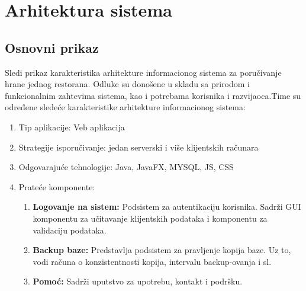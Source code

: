 \newpage
\section{Arhitektura sistema}
\subsection{Osnovni prikaz}
Sledi prikaz karakteristika arhitekture informacionog sistema za poručivanje hrane jednog restorana. Odluke su donošene u skladu sa prirodom i funkcionalnim zahtevima sistema, kao i potrebama korisnika i razvijaoca.Time su određene sledeće karakteristike arhitekture informacionog sistema:
\begin{enumerate}
    \item Tip aplikacije: Veb aplikacija
    \item Strategije isporučivanje: jedan serverski i više klijentskih računara
    \item Odgovarajuće tehnologije: Java, JavaFX, MYSQL, JS, CSS
    \item Prateće komponente:
    \begin{enumerate}
        \item \textbf{Logovanje na sistem:} Podsistem za autentikaciju korisnika. Sadrži GUI komponentu za učitavanje klijentskih podataka i komponentu za validaciju podataka.
        \item \textbf{Backup baze:} Predstavlja podsistem za pravljenje kopija baze. Uz to, vodi računa o konzistentnosti kopija, intervalu backup-ovanja i sl.
        \item \textbf{Pomoć:} Sadrži uputstvo za upotrebu, kontakt i podršku.
        
    \end{enumerate}
\end{enumerate}

